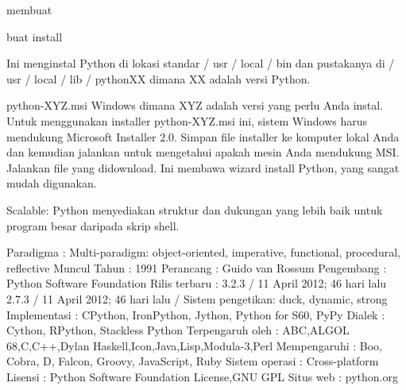 \noindent 
{\fontsize{14pt}{14pt}\selectfont membuat \\} \par
\vspace{14pt}
\noindent 
{\fontsize{14pt}{14pt}\selectfont buat install \\} \par
\vspace{14pt}
\noindent 
{\fontsize{14pt}{14pt}\selectfont Ini menginstal Python di lokasi standar / usr / local / bin dan pustakanya di / usr / local / lib / pythonXX dimana XX adalah versi Python. \\} \par
\vspace{14pt}
\noindent 
{\fontsize{14pt}{14pt}\selectfont python-XYZ.msi Windows dimana XYZ adalah versi yang perlu Anda instal. Untuk menggunakan installer python-XYZ.msi ini, sistem Windows harus mendukung Microsoft Installer 2.0. Simpan file installer ke komputer lokal Anda dan kemudian jalankan untuk mengetahui apakah mesin Anda mendukung MSI. Jalankan file yang didownload. Ini membawa wizard install Python, yang sangat mudah digunakan. \\} \par
\vspace{14pt}
\vspace{14pt}
\noindent 
{\fontsize{14pt}{14pt}\selectfont Scalable: Python menyediakan struktur dan dukungan yang lebih baik untuk program besar daripada skrip shell. \\} \par
\vspace{14pt}
\noindent 
{\fontsize{14pt}{14pt}\selectfont Paradigma : Multi-paradigm: object-oriented, imperative, functional, procedural, reflective\vspace{\baselineskip}
Muncul Tahun : 1991\vspace{\baselineskip}
Perancang : Guido van Rossum\vspace{\baselineskip}
Pengembang : Python Software Foundation\vspace{\baselineskip}
Rilis terbaru : 3.2.3 / 11 April 2012; 46 hari lalu 2.7.3 / 11 April 2012; 46 hari lalu /\vspace{\baselineskip}
Sistem pengetikan: duck, dynamic, strong\vspace{\baselineskip}
Implementasi : CPython, IronPython, Jython, Python for S60, PyPy\vspace{\baselineskip}
Dialek : Cython, RPython, Stackless Python\vspace{\baselineskip}
Terpengaruh oleh : ABC,ALGOL 68,C,C++,Dylan Haskell,Icon,Java,Lisp,Modula-3,Perl\vspace{\baselineskip}
Mempengaruhi : Boo, Cobra, D, Falcon, Groovy, JavaScript, Ruby\vspace{\baselineskip}
Sistem operasi : Cross-platform\vspace{\baselineskip}
Lisensi : Python Software Foundation License,GNU GPL\vspace{\baselineskip}
Situs web : python.org \\} \par
